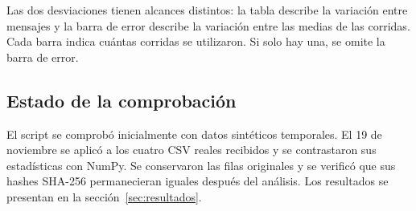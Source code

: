 Las dos desviaciones tienen alcances distintos: la tabla describe la
variación entre mensajes y la barra de error describe la variación
entre las medias de las corridas. Cada barra indica cuántas corridas
se utilizaron. Si solo hay una, se omite la barra de error.

\subsection{Estado de la comprobación}
El script se comprobó inicialmente con datos sintéticos temporales.
El 19 de noviembre se aplicó a los cuatro CSV reales recibidos y se
contrastaron sus estadísticas con NumPy. Se conservaron las filas
originales y se verificó que sus hashes SHA-256 permanecieran iguales
después del análisis. Los resultados se presentan en la
sección~\ref{sec:resultados}.
